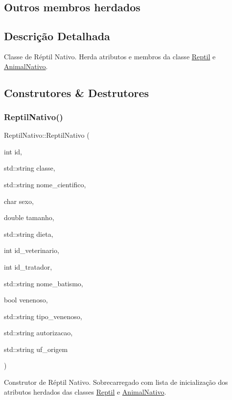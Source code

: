 \subsection*{Outros membros herdados}


\subsection{Descrição Detalhada}
Classe de Réptil Nativo. Herda atributos e membros da classe \hyperlink{classReptil}{Reptil} e \hyperlink{classAnimalNativo}{Animal\+Nativo}. 

\subsection{Construtores \& Destrutores}
\mbox{\label{classReptilNativo_ab23dadfa1a143b980b0b0a8d16ff0d05}} 
\subsubsection{\texorpdfstring{Reptil\+Nativo()}{ReptilNativo()}}
{\footnotesize\ttfamily Reptil\+Nativo\+::\+Reptil\+Nativo (\begin{DoxyParamCaption}\item[{int}]{id,  }\item[{std\+::string}]{classe,  }\item[{std\+::string}]{nome\+\_\+cientifico,  }\item[{char}]{sexo,  }\item[{double}]{tamanho,  }\item[{std\+::string}]{dieta,  }\item[{int}]{id\+\_\+veterinario,  }\item[{int}]{id\+\_\+tratador,  }\item[{std\+::string}]{nome\+\_\+batismo,  }\item[{bool}]{venenoso,  }\item[{std\+::string}]{tipo\+\_\+venenoso,  }\item[{std\+::string}]{autorizacao,  }\item[{std\+::string}]{uf\+\_\+origem }\end{DoxyParamCaption})}

Construtor de Réptil Nativo. Sobrecarregado com lista de inicialização dos atributos herdados das classes \hyperlink{classReptil}{Reptil} e \hyperlink{classAnimalNativo}{Animal\+Nativo}. \mbox{\label{classReptilNativo_a6de5838fd62a1c61175e690110cd7dc0}} 
